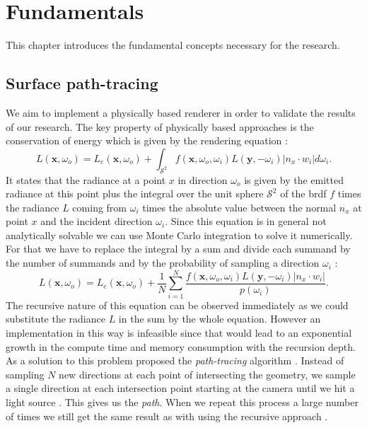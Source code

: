 \chapter{Fundamentals}
This chapter introduces the fundamental concepts necessary for the research.
\section{Surface path-tracing}
We aim to implement a physically based renderer in order to validate the results of our research.
The key property of physically based approaches is the conservation of energy which is given by the rendering equation \cite[p. 1]{rendering_equation}:
\begin{equation}
    \label{eq:render_equation}
    L(\boldsymbol{x}, \omega_o) = L_e(\boldsymbol{x}, \omega_o) + \int_{\mathcal{S}^2} f(\boldsymbol{x}, \omega_o, \omega_i) L(\boldsymbol{y}, -\omega_i) |n_x \cdot w_i| d\omega_i.
\end{equation}
It states that the radiance at a point $x$ in direction $\omega_o$ is given by the emitted radiance at this point plus the integral over the unit sphere $\mathcal{S}^2$ of the \ac{brdf} $f$ times the radiance $L$ coming from $\omega_i$ times the absolute value between the normal $n_x$ at point $x$ and the incident direction $\omega_i$.
Since this equation is in general not analytically solvable we can use Monte Carlo integration to solve it numerically.
For that we have to replace the integral by a sum and divide each summand by the number of summands and by the probability of sampling a direction $\omega_i$ \cite[p. 856]{pbr}:
\begin{equation}
    L(\boldsymbol{x}, \omega_o) = L_e(\boldsymbol{x}, \omega_o) + \frac{1}{N}\sum_{i=1}^{N} \frac{f(\boldsymbol{x}, \omega_o, \omega_i) L(\boldsymbol{y}, -\omega_i) |n_x \cdot w_i|}{p(\omega_i)}.
\end{equation}
The recursive nature of this equation can be observed immediately as we could substitute the radiance $L$ in the sum by the whole equation.
However an implementation in this way is infeasible since that would lead to an exponential growth in the compute time and memory consumption with the recursion depth.
As a solution to this problem \citeauthor{rendering_equation} proposed the \textit{path-tracing} algorithm \cite[p. 6]{rendering_equation}.
Instead of sampling $N$ new directions at each point of intersecting the geometry, we sample a single direction at each intersection point starting at the camera until we hit a light source \cite[p. 6]{rendering_equation}.
This gives us the \textit{path}.
When we repeat this process a large number of times we still get the same result as with using the recursive approach \cite[p. 870]{pbr}.

